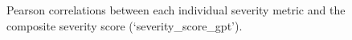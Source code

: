 \documentclass[
]{agujournal2019}
\begin{document}
\label{cell-fig-metric-corplot}
\begin{figure}[H]


\caption{\label{fig-metric-corplot}Pearson correlations between each
individual severity metric and the composite severity score
(`severity\_score\_gpt').}

\end{figure}%
\end{document}
